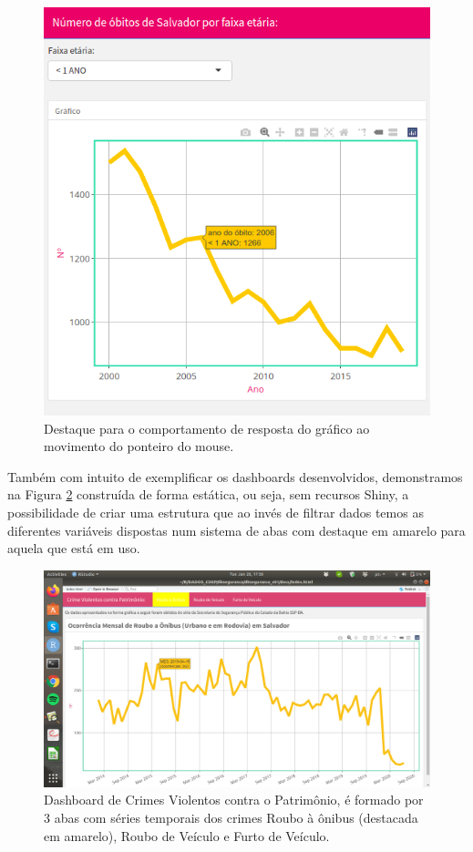 \documentclass[
]{book}
\begin{document}
\begin{figure}
\includegraphics[width=7.86in]{images/image82} \caption{Destaque para o comportamento de resposta do gráfico ao movimento do ponteiro do mouse.}\label{fig:dashm3cossa}
\end{figure}

Também com intuito de exemplificar os dashboards desenvolvidos, demonstramos na Figura \ref{fig:dashm4cossa} construída de forma estática, ou seja, sem recursos Shiny, a possibilidade de criar uma estrutura que ao invés de filtrar dados temos as diferentes variáveis dispostas num sistema de abas com destaque em amarelo para aquela que está em uso.

\begin{figure}
\includegraphics[width=18.97in]{images/image9} \caption{Dashboard de Crimes Violentos contra o Patrimônio, é formado por 3 abas com séries temporais dos crimes Roubo à ônibus (destacada em amarelo), Roubo de Veículo e Furto de Veículo.}\label{fig:dashm4cossa}
\end{figure}
\end{document}
